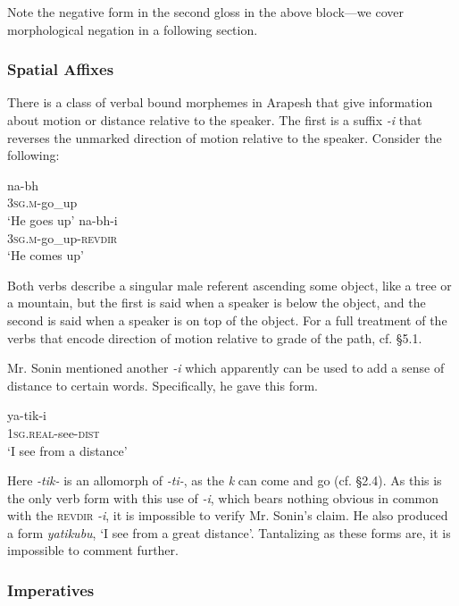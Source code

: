 \documentclass[pdftex,12pt,letterpaper]{article}
\let\ipa\textipa
\begin{document}
Note the negative form in the second gloss in the above block---we cover morphological negation in a following section.

\subsubsection{Spatial Affixes}

There is a class of verbal bound morphemes in Arapesh that give information about motion or distance relative to the speaker. The first is a suffix \emph{-i} that reverses the unmarked direction of motion relative to the speaker. Consider the following:

\begin{exe}
\ex
\gll na-b\ipa{@}h \\
\textsc{3sg.m}-go\_up \\
\trans `He goes up'
\ex
\gll na-b\ipa{@}h-i \\
\textsc{3sg.m}-go\_up-\textsc{revdir} \\
\trans `He comes up'
\end{exe}

Both verbs describe a singular male referent ascending some object, like a tree or a mountain, but the first is said when a speaker is below the object, and the second is said when a speaker is on top of the object. For a full treatment of the verbs that encode direction of motion relative to grade of the path, cf. \S 5.1.

Mr. Sonin mentioned another \emph{-i} which apparently can be used to add a sense of distance to certain words. Specifically, he gave this form.

\begin{exe}
\ex
\gll ya-tik-i \\
\textsc{1sg.real}-see-\textsc{dist} \\
\trans `I see from a distance'
\end{exe}

Here \emph{-tik-} is an allomorph of \emph{-ti-}, as the \emph{k} can come and go (cf. \S 2.4). As this is the only verb form with this use of \emph{-i}, which bears nothing obvious in common with the \textsc{revdir} \emph{-i}, it is impossible to verify Mr. Sonin's claim. He also produced a form \emph{yatikubu}, `I see from a great distance'. Tantalizing as these forms are, it is impossible to comment further.

\subsubsection{Imperatives}
\end{document}
